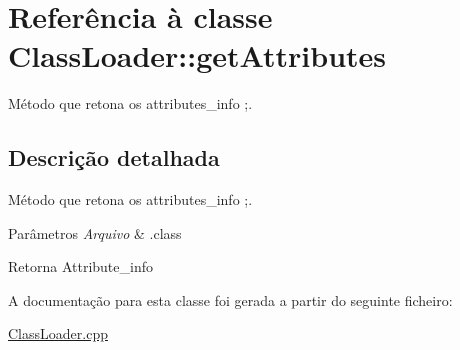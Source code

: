\hypertarget{class_class_loader_1_1get_attributes}{}\section{Referência à classe Class\+Loader\+:\+:get\+Attributes}
\label{class_class_loader_1_1get_attributes}


Método que retona os attributes\+\_\+info ;.  




\subsection{Descrição detalhada}
Método que retona os attributes\+\_\+info ;. 


\begin{DoxyParams}{Parâmetros}
{\em Arquivo} & .class \\
\hline
\end{DoxyParams}
\begin{DoxyReturn}{Retorna}
Attribute\+\_\+info 
\end{DoxyReturn}


A documentação para esta classe foi gerada a partir do seguinte ficheiro\+:\begin{DoxyCompactItemize}
\item 
\hyperlink{_class_loader_8cpp}{Class\+Loader.\+cpp}\end{DoxyCompactItemize}
